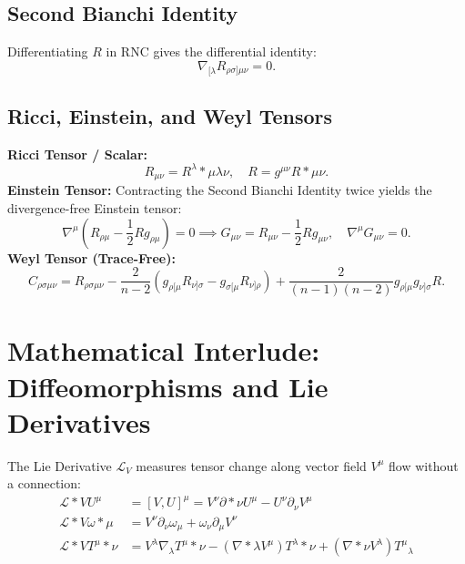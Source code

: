 \documentclass[11pt, a4paper]{report}
\begin{document}
\subsection*{Second Bianchi Identity}
Differentiating $R$ in RNC gives the differential identity:
\begin{equation}
\nabla_{[\lambda} R_{\rho\sigma]\mu\nu} = 0.
\end{equation}

\subsection*{Ricci, Einstein, and Weyl Tensors}
\textbf{Ricci Tensor / Scalar:}
\begin{equation}
R_{\mu\nu} = {R^\lambda}*{\mu\lambda\nu}, \quad R = g^{\mu\nu} R*{\mu\nu}.
\end{equation}
\textbf{Einstein Tensor:}
Contracting the Second Bianchi Identity twice yields the divergence-free Einstein tensor:
\begin{equation}
\nabla^\mu \left( R_{\rho\mu} - \frac{1}{2} R g_{\rho\mu} \right) = 0 \implies G_{\mu\nu} = R_{\mu\nu} - \frac{1}{2} R g_{\mu\nu}, \quad \nabla^\mu G_{\mu\nu} = 0.
\end{equation}
\textbf{Weyl Tensor (Trace-Free):}
\begin{equation}
C_{\rho\sigma\mu\nu} = R_{\rho\sigma\mu\nu} - \frac{2}{n-2} (g_{\rho[\mu} R_{\nu]\sigma} - g_{\sigma[\mu} R_{\nu]\rho}) + \frac{2}{(n-1)(n-2)} g_{\rho[\mu} g_{\nu]\sigma} R.
\end{equation}

\section{Mathematical Interlude: Diffeomorphisms and Lie Derivatives}
The Lie Derivative $\mathcal{L}_V$ measures tensor change along vector field $V^\mu$ flow without a connection:
\begin{align}
\mathcal{L}*V U^\mu &= [V, U]^\mu = V^\nu \partial*\nu U^\mu - U^\nu \partial_\nu V^\mu \\
\mathcal{L}*V \omega*\mu &= V^\nu \partial_\nu \omega_\mu + \omega_\nu \partial_\mu V^\nu \\
\mathcal{L}*V {T^\mu}*\nu &= V^\lambda \nabla_\lambda {T^\mu}*\nu - (\nabla*\lambda V^\mu) {T^\lambda}*\nu + (\nabla*\nu V^\lambda) {T^\mu}_\lambda
\end{align}
\end{document}
